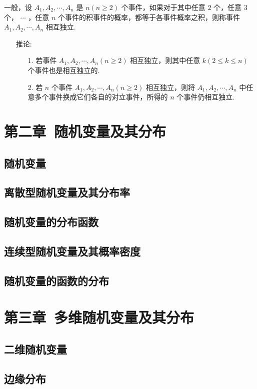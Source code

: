 \documentclass[UTF8]{ctexart}
\begin{document}
	{一般，设 $ A_{1},A_{2}, \cdots ,A_{n} $ 是 $ n(n \ge 2) $ 个事件，如果对于其中任意 $ 2 $ 个，任意 $ 3 $ 个， $ \cdots $ ，任意 $ n $ 个事件的积事件的概率，都等于各事件概率之积，则称事件 $ A_{1},A_{2}, \cdots ,A_{n} $ 相互独立.}
	
	\begin{itemize}
		\item [推论:] {
			\begin{enumerate}
				\item [1.] {若事件 $ A_{1},A_{2}, \cdots ,A_{n}(n \ge 2) $ 相互独立，则其中任意 $ k(2 \le k \le n) $ 个事件也是相互独立的.}
				\item [2.] {若 $ n $ 个事件 $ A_{1},A_{2}, \cdots ,A_{n}(n \ge 2) $ 相互独立，则将 $ A_{1},A_{2}, \cdots ,A_{n} $ 中任意多个事件换成它们各自的对立事件，所得的 $ n $ 个事件仍相互独立.}
			\end{enumerate}
		}
	\end{itemize}
	
	\section{第二章\ 随机变量及其分布}
	\subsection{随机变量}
	\subsection{离散型随机变量及其分布率}
	\subsection{随机变量的分布函数}
	\subsection{连续型随机变量及其概率密度}
	\subsection{随机变量的函数的分布}
	\section{第三章\ 多维随机变量及其分布}
	\subsection{二维随机变量}
	\subsection{边缘分布}
\end{document}

